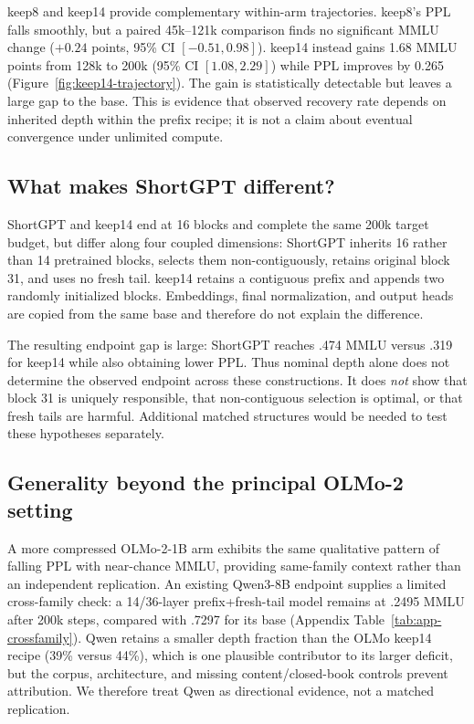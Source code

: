 keep8 and keep14 provide complementary within-arm trajectories. keep8's PPL
falls smoothly, but a paired 45k--121k comparison finds no significant MMLU
change ($+0.24$ points, 95\% CI $[-0.51,0.98]$). keep14 instead gains
1.68 MMLU points from 128k to 200k (95\% CI $[1.08,2.29]$) while PPL improves
by 0.265 (Figure~\ref{fig:keep14-trajectory}). The gain is statistically
detectable but leaves a large gap to the base. This is evidence that observed
recovery rate depends on inherited depth within the prefix recipe; it is not a
claim about eventual convergence under unlimited compute.

\subsection{What makes ShortGPT different?}


ShortGPT and keep14 end at 16 blocks and complete the same 200k target budget,
but differ along four coupled dimensions: ShortGPT inherits 16 rather than 14
pretrained blocks, selects them non-contiguously, retains original block 31, and
uses no fresh tail. keep14 retains a contiguous prefix and appends two randomly
initialized blocks. Embeddings, final normalization, and output heads are copied
from the same base and therefore do not explain the difference.

The resulting endpoint gap is large: ShortGPT reaches .474 MMLU versus .319 for
keep14 while also obtaining lower PPL. Thus nominal depth alone does not
determine the observed endpoint across these constructions. It does \emph{not} show
that block 31 is uniquely responsible, that non-contiguous selection is optimal,
or that fresh tails are harmful. Additional matched structures would be needed
to test these hypotheses separately.

\subsection{Generality beyond the principal OLMo-2 setting}
A more compressed OLMo-2-1B arm exhibits the same qualitative pattern of falling
PPL with near-chance MMLU, providing same-family context rather than an
independent replication. An existing Qwen3-8B endpoint supplies a limited
cross-family check: a 14/36-layer prefix+fresh-tail model remains at .2495 MMLU
after 200k steps, compared with .7297 for its base (Appendix
Table~\ref{tab:app-crossfamily}). Qwen retains a smaller depth fraction than the
OLMo keep14 recipe (39\% versus 44\%), which is one plausible contributor to its
larger deficit, but the corpus, architecture, and missing content/closed-book
controls prevent attribution. We therefore treat Qwen as directional evidence,
not a matched replication.
